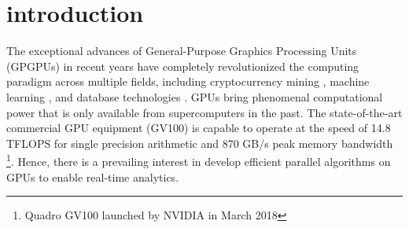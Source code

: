 \section{introduction}
The exceptional advances of General-Purpose Graphics Processing Units (GPGPUs) 
in recent years have completely revolutionized the computing paradigm across multiple fields, including cryptocurrency mining \cite{o2014bitcoin,taylor2013bitcoin}, machine learning \cite{coates2013deep,abadi2016tensorflow}, and database technologies \cite{bakkum2010accelerating,kaldewey2012gpu}.
GPUs bring phenomenal computational power that is only available from supercomputers in the past. 
The state-of-the-art commercial GPU equipment (GV100) is capable to operate at the speed of 14.8 TFLOPS for single precision arithmetic and 870 GB/s peak memory bandwidth \footnote{Quadro GV100 launched by NVIDIA in March 2018}. 
Hence, there is a prevailing interest in develop efficient parallel algorithms on GPUs to enable real-time analytics.

